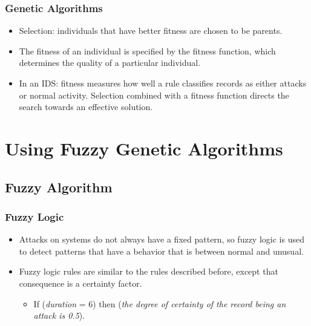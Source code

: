 \documentclass{beamer}
\newcommand{\linespace}{\vskip 0.25cm}
\begin{document}
\begin{frame}
  \frametitle{Genetic Algorithms}
	\begin{itemize}
        \item Selection: individuals that have better fitness are chosen to be parents.
        \item The fitness of an individual is specified by the fitness function, which determines the quality of a particular individual.
        
        \linespace
        \linespace
        
       	\item In an IDS: fitness measures how well a rule classifies records as either attacks or normal activity. Selection combined with a fitness function directs the search towards an effective solution.
	\end{itemize}
\end{frame}
\section[Using Fuzzy Genetic Algorithms]{Using Fuzzy Genetic Algorithms}

\subsection{Fuzzy Algorithm}

\begin{frame}
	\frametitle{Fuzzy Logic}
	\begin{itemize}
		\item Attacks on systems do not always have a fixed pattern, so fuzzy logic is used to detect patterns that have a behavior that is between normal and unusual.
		\item Fuzzy logic rules are similar to the rules described before, except that
consequence is a certainty factor. 
		\begin{itemize}
			\item If (\emph{duration} = 6) then (\emph{the degree of certainty of the record being an attack is 0.5}).
		\end{itemize}
	\end{itemize}
\end{frame}
\end{document}
